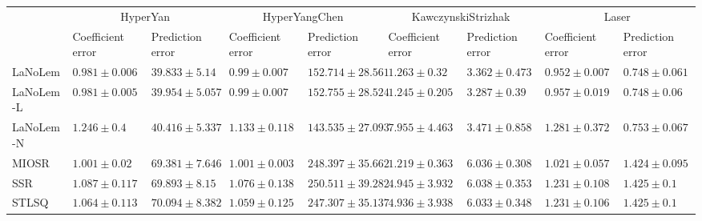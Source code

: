 \begin{table*}
{\begin{tabular}{lllllllll}
 & \multicolumn{2}{c}{HyperYan} & \multicolumn{2}{c}{HyperYangChen} & \multicolumn{2}{c}{KawczynskiStrizhak} & \multicolumn{2}{c}{Laser} \\
 & Coefficient error & Prediction error & Coefficient error & Prediction error & Coefficient error & Prediction error & Coefficient error & Prediction error \\
\midrule
LaNoLem & $\mathbf{0.981}\pm 0.006$ & $\mathbf{39.833}\pm 5.14$ & $0.99\pm 0.007$ & $152.714\pm 28.561$ & $1.263\pm 0.32$ & $3.362\pm 0.473$ & $\mathbf{0.952}\pm 0.007$ & $0.748\pm 0.061$ \\
LaNoLem-L & $0.981\pm 0.005$ & $39.954\pm 5.057$ & $\mathbf{0.99}\pm 0.007$ & $152.755\pm 28.524$ & $1.245\pm 0.205$ & $\mathbf{3.287}\pm 0.39$ & $0.957\pm 0.019$ & $\mathbf{0.748}\pm 0.06$ \\
LaNoLem-N & $1.246\pm 0.4$ & $40.416\pm 5.337$ & $1.133\pm 0.118$ & $\mathbf{143.535}\pm 27.093$ & $7.955\pm 4.463$ & $3.471\pm 0.858$ & $1.281\pm 0.372$ & $0.753\pm 0.067$ \\
MIOSR & $1.001\pm 0.02$ & $69.381\pm 7.646$ & $1.001\pm 0.003$ & $248.397\pm 35.662$ & $\mathbf{1.219}\pm 0.363$ & $6.036\pm 0.308$ & $1.021\pm 0.057$ & $1.424\pm 0.095$ \\
SSR & $1.087\pm 0.117$ & $69.893\pm 8.15$ & $1.076\pm 0.138$ & $250.511\pm 39.282$ & $4.945\pm 3.932$ & $6.038\pm 0.353$ & $1.231\pm 0.108$ & $1.425\pm 0.1$ \\
STLSQ & $1.064\pm 0.113$ & $70.094\pm 8.382$ & $1.059\pm 0.125$ & $247.307\pm 35.137$ & $4.936\pm 3.938$ & $6.033\pm 0.348$ & $1.231\pm 0.106$ & $1.425\pm 0.1$ \\

\midrule


\end{tabular}}
\end{table*}
